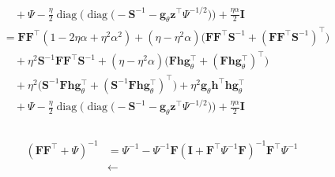 \documentclass[msc,deptreport.inf]{infthesis} %
\newcommand{\matr}[1]{\mathbf{#1}}
\newcommand{\diag}{\mathop{\mathrm{diag}}}
\begin{document}
\begin{align}
\begin{split}
	& \quad + \Psi - \frac{\eta}{2}\diag\Big(\diag\big( -\matr{S}^{-1} -\matr{g}_\theta \matr{z}^\intercal \Psi^{-1/2}  \big) \Big) + \frac{\eta \alpha}{2} \matr{I} \\
	& = \matr{F}\matr{F}^\intercal (1 -2\eta\alpha +\eta^2\alpha^2)
	+ (\eta -\eta^2\alpha)\big( \matr{F}\matr{F}^\intercal \matr{S}^{-1} + (\matr{F}\matr{F}^\intercal \matr{S}^{-1})^\intercal \big) \\
	& \quad + \eta^2 \matr{S}^{-1}\matr{F}\matr{F}^\intercal \matr{S}^{-1}
	+ (\eta -\eta^2 \alpha) \big( \matr{F} \matr{h} \matr{g}_\theta^\intercal + (\matr{F} \matr{h} \matr{g}_\theta^\intercal)^\intercal \big) \\
	& \quad + \eta^2\big( \matr{S}^{-1}\matr{F} \matr{h} \matr{g}_\theta^\intercal + (\matr{S}^{-1}\matr{F} \matr{h} \matr{g}_\theta^\intercal)^\intercal \big) 
	+ \eta^2 \matr{g}_\theta \matr{h}^\intercal \matr{h} \matr{g}_\theta^\intercal \\
	& \quad + \Psi - \frac{\eta}{2}\diag\Big(\diag\big( -\matr{S}^{-1} -\matr{g}_\theta \matr{z}^\intercal \Psi^{-1/2}  \big) \Big) + \frac{\eta \alpha}{2} \matr{I} \\
\end{split}
\end{align}


\begin{align}
\begin{split}
	(\matr{F}\matr{F}^\intercal + \Psi)^{-1} 
	& = \Psi^{-1} - \Psi^{-1}\matr{F}(\matr{I} + \matr{F}^\intercal \Psi^{-1} \matr{F})^{-1} \matr{F}^\intercal \Psi^{-1} \\
	& \leftarrow
\end{split}
\end{align}
\end{document}
